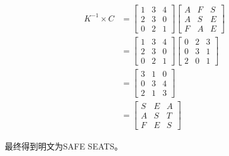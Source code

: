 \begin{align*}
    K^{-1} \times C & =
    \begin{bmatrix}
        1 & 3 & 4 \\
        2 & 3 & 0 \\
        0 & 2 & 1
    \end{bmatrix}
    \begin{bmatrix}
        A & F & S \\
        A & S & E \\
        F & A & E
    \end{bmatrix}
    \\
                    & =
    \begin{bmatrix}
        1 & 3 & 4 \\
        2 & 3 & 0 \\
        0 & 2 & 1
    \end{bmatrix}
    \begin{bmatrix}
        0 & 2 & 3 \\
        0 & 3 & 1 \\
        2 & 0 & 1
    \end{bmatrix}
    \\
                    & =
    \begin{bmatrix}
        3 & 1 & 0 \\
        0 & 3 & 4 \\
        2 & 1 & 3
    \end{bmatrix}
    \\
                    & =
    \begin{bmatrix}
        S & E & A \\
        A & S & T \\
        F & E & S
    \end{bmatrix}
\end{align*}

\vspace{0.5cm}

最终得到明文为SAFE SEATS。

\newpage